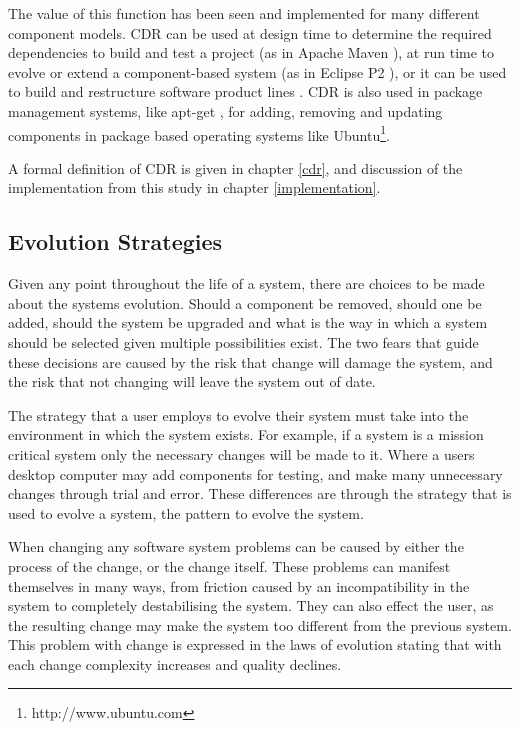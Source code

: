 The value of this function has been seen and implemented for many different component models.
CDR can be used at design time to determine the required dependencies to build and test a project (as in Apache Maven \cite{casey_better_2008}),
at run time to evolve or extend a component-based system (as in Eclipse P2 \cite{leBerre2010}),
or it can be used to build and restructure software product lines \cite{savolainen_analyzing_2007}.
CDR is also used in package management systems, like apt-get \cite{Barth2005},
for adding, removing and updating components in package based operating systems like Ubuntu\footnote{http://www.ubuntu.com}. 

A formal definition of CDR is given in chapter \ref{cdr}, and discussion of the implementation from this study in chapter \ref{implementation}.

\subsection{Evolution Strategies}
Given any point throughout the life of a system, there are choices to be made about the systems evolution.
Should a component be removed, should one be added, should the system be upgraded and what is the way in which a system should be selected given multiple possibilities exist.
The two fears that guide these decisions are caused by the risk that change will damage the system, and the risk that not changing will leave the system out of date.

The strategy that a user employs to evolve their system must take into the environment in which the system exists.
For example, if a system is a mission critical system only the necessary changes will be made to it.
Where a users desktop computer may add components for testing, and make many unnecessary changes through trial and error.
These differences are through the strategy that is used to evolve a system, the pattern to evolve the system.

When changing any software system problems can be caused by either the process of the change, or the change itself.
These problems can manifest themselves in many ways, from friction caused by an incompatibility in the system to completely destabilising the system.
They can also effect the user, as the resulting change may make the system too different from the previous system.
This problem with change is expressed in the laws of evolution stating that with each change complexity increases and quality declines.

